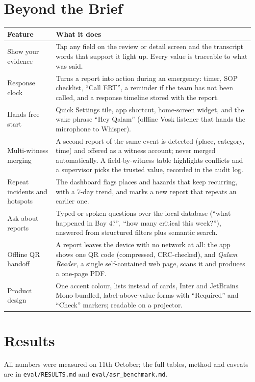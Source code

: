 \documentclass[9pt,a4paper]{extarticle}
\newcommand{\code}[1]{{\small\texttt{#1}}}
\begin{document}
\section{Beyond the Brief}
\begin{tabularx}{\linewidth}{@{}p{3.1cm}L@{}}
\toprule
\textbf{Feature} & \textbf{What it does}\\
\midrule
Show your evidence & Tap any field on the review or detail screen and the transcript words that support it light up. Every value is traceable to what was said.\\
Response clock & Turns a report into action during an emergency: timer, SOP checklist, ``Call ERT'', a reminder if the team has not been called, and a response timeline stored with the report.\\
Hands-free start & Quick Settings tile, app shortcut, home-screen widget, and the wake phrase ``Hey Qalam'' (offline Vosk listener that hands the microphone to Whisper).\\
Multi-witness merging & A second report of the same event is detected (place, category, time) and offered as a witness account; never merged automatically. A field-by-witness table highlights conflicts and a supervisor picks the trusted value, recorded in the audit log.\\
Repeat incidents and hotspots & The dashboard flags places and hazards that keep recurring, with a 7-day trend, and marks a new report that repeats an earlier one.\\
Ask about reports & Typed or spoken questions over the local database (``what happened in Bay 4?'', ``how many critical this week?''), answered from structured filters plus semantic search.\\
Offline QR handoff & A report leaves the device with no network at all: the app shows one QR code (compressed, CRC-checked), and \emph{Qalam Reader}, a single self-contained web page, scans it and produces a one-page PDF.\\
Product design & One accent colour, lists instead of cards, Inter and JetBrains Mono bundled, label-above-value forms with ``Required'' and ``Check'' markers; readable on a projector.\\
\bottomrule
\end{tabularx}

\section{Results}
All numbers were measured on 11th October; the full tables, method and caveats are in \code{eval/RESULTS.md} and \code{eval/asr\_benchmark.md}.
\end{document}

